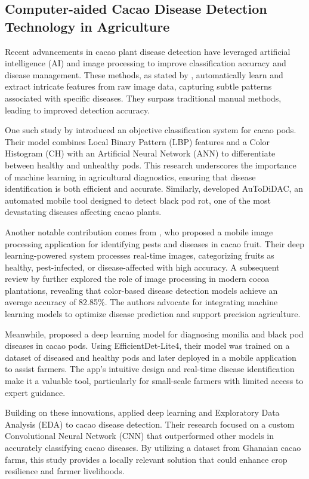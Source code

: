 \subsection*{Computer-aided Cacao Disease Detection Technology in Agriculture}
Recent advancements in cacao plant disease detection have leveraged artificial intelligence (AI) and image processing to improve classification accuracy and disease management. These methods, as stated by \cite{Upadhyay2025}, automatically learn and extract intricate features from raw image data, capturing subtle patterns associated with specific diseases. They surpass traditional manual methods, leading to improved detection accuracy.

One such study by \cite{BaculioBarbosa2022} introduced an objective classification system for cacao pods. Their model combines Local Binary Pattern (LBP) features and a Color Histogram (CH) with an Artificial Neural Network (ANN) to differentiate between healthy and unhealthy pods. This research underscores the importance of machine learning in agricultural diagnostics, ensuring that disease identification is both efficient and accurate. Similarly, \cite{Tan2018} developed AuToDiDAC, an automated mobile tool designed to detect black pod rot, one of the most devastating diseases affecting cacao plants.

Another notable contribution comes from \cite{Basri2020}, who proposed a mobile image processing application for identifying pests and diseases in cacao fruit. Their deep learning-powered system processes real-time images, categorizing fruits as healthy, pest-infected, or disease-affected with high accuracy. A subsequent review by \cite{Basri2020} further explored the role of image processing in modern cocoa plantations, revealing that color-based disease detection models achieve an average accuracy of 82.85\%. The authors advocate for integrating machine learning models to optimize disease prediction and support precision agriculture.

Meanwhile, \cite{Buenano2024} proposed a deep learning model for diagnosing monilia and black pod diseases in cacao pods. Using EfficientDet-Lite4, their model was trained on a dataset of diseased and healthy pods and later deployed in a mobile application to assist farmers. The app's intuitive design and real-time disease identification make it a valuable tool, particularly for small-scale farmers with limited access to expert guidance.

Building on these innovations, \cite{Tovurawa2025} applied deep learning and Exploratory Data Analysis (EDA) to cacao disease detection. Their research focused on a custom Convolutional Neural Network (CNN) that outperformed other models in accurately classifying cacao diseases. By utilizing a dataset from Ghanaian cacao farms, this study provides a locally relevant solution that could enhance crop resilience and farmer livelihoods.

